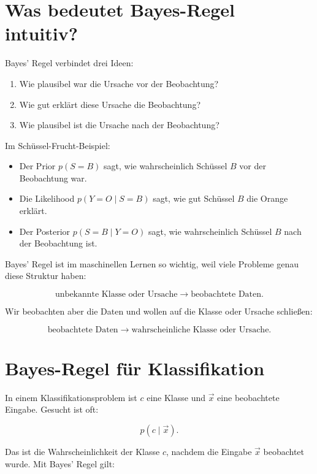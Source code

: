 \section{Was bedeutet Bayes-Regel intuitiv?}

Bayes' Regel verbindet drei Ideen:

\begin{enumerate}
    \item Wie plausibel war die Ursache vor der Beobachtung?
    \item Wie gut erklärt diese Ursache die Beobachtung?
    \item Wie plausibel ist die Ursache nach der Beobachtung?
\end{enumerate}

Im Schüssel-Frucht-Beispiel:

\begin{itemize}
    \item Der Prior \(p(S=B)\) sagt, wie wahrscheinlich Schüssel \(B\) vor der Beobachtung war.
    \item Die Likelihood \(p(Y=O \mid S=B)\) sagt, wie gut Schüssel \(B\) die Orange erklärt.
    \item Der Posterior \(p(S=B \mid Y=O)\) sagt, wie wahrscheinlich Schüssel \(B\) nach der Beobachtung ist.
\end{itemize}

\begin{conceptbox}
Bayes' Regel ist im maschinellen Lernen so wichtig, weil viele Probleme genau diese Struktur haben:

\[
    \text{unbekannte Klasse oder Ursache}
    \longrightarrow
    \text{beobachtete Daten}.
\]

Wir beobachten aber die Daten und wollen auf die Klasse oder Ursache schließen:

\[
    \text{beobachtete Daten}
    \longrightarrow
    \text{wahrscheinliche Klasse oder Ursache}.
\]
\end{conceptbox}

\section{Bayes-Regel für Klassifikation}

In einem Klassifikationsproblem ist \(c\) eine Klasse und \(\vec{x}\) eine beobachtete Eingabe.
Gesucht ist oft:

\[
    p(c \mid \vec{x}).
\]

Das ist die Wahrscheinlichkeit der Klasse \(c\), nachdem die Eingabe \(\vec{x}\) beobachtet wurde.
Mit Bayes' Regel gilt:

